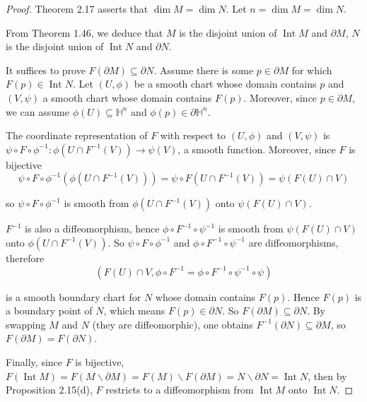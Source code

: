 \begin{proof}
    Theorem 2.17 asserts that \( \dim M = \dim N \). Let \( n = \dim M = \dim N \).

    From Theorem 1.46, we deduce that \( M \) is the disjoint union of \( \operatorname{Int} M \) and \( \partial M \), \( N \) is the disjoint union of \( \operatorname{Int} N \) and \( \partial N \).

    It suffices to prove \( F(\partial M) \subseteq \partial N \). Assume there is some \( p \in \partial M  \) for which \( F(p) \in \operatorname{Int} N \). Let \( (U, \phi) \) be a smooth chart whose domain contains \( p \) and \( (V, \psi) \) a smooth chart whose domain contains \( F(p) \). Moreover, since \( p \in \partial M \), we can assume \( \phi(U) \subseteq \mathbb{H}^{n}  \) and \( \phi(p) \in \partial \mathbb{H}^{n} \).

    The coordinate representation of \( F \) with respect to \( (U, \phi) \) and \( (V, \psi) \) is \( \psi \circ F \circ \phi^{-1}: \phi(U \cap F^{-1}(V)) \to \psi(V) \), a smooth function. Moreover, since \( F \) is bijective
    \[
        \psi \circ F \circ \phi^{-1}(\phi(U \cap F^{-1}(V))) = \psi \circ F (U \cap F^{-1}(V)) = \psi(F(U) \cap V)
    \]

    so \( \psi \circ F \circ \phi^{-1} \) is smooth from \( \phi(U \cap F^{-1}(V)) \) onto \( \psi(F(U) \cap V) \).

    \( F^{-1} \) is also a diffeomorphism, hence \( \phi \circ F^{-1} \circ \psi^{-1} \) is smooth from \( \psi(F(U) \cap V) \) onto \( \phi(U \cap F^{-1}(V)) \). So \( \psi \circ F \circ \phi^{-1} \) and \( \phi \circ F^{-1} \circ \psi^{-1} \) are diffeomorphisms, therefore
    \[
        (F(U) \cap V, \phi \circ F^{-1} = \phi \circ F^{-1} \circ \psi^{-1} \circ \psi)
    \]

    is a smooth boundary chart for \( N \) whose domain contains \( F(p) \). Hence \( F(p) \) is a boundary point of \( N \), which means \( F(p) \in \partial N \). So \( F(\partial M) \subseteq \partial N \). By swapping \( M \) and \( N \) (they are diffeomorphic), one obtains \( F^{-1}(\partial N) \subseteq \partial M \), so \( F(\partial M) = F(\partial N) \).

    Finally, since \( F \) is bijective, \( F(\operatorname{Int} M) = F(M \smallsetminus \partial M) = F(M) \smallsetminus F(\partial M) = N \smallsetminus \partial N = \operatorname{Int} N \), then by Proposition 2.15(d), \( F \) restricts to a diffeomorphism from \( \operatorname{Int} M \) onto \( \operatorname{Int} N \).
\end{proof}

